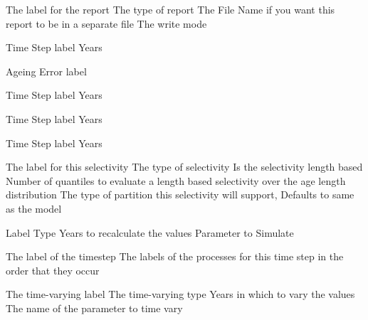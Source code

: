  {The label for the report}
 {The type of report}
 {The File Name if you want this report to be in a separate file}
 {The write mode}
\par\textbf{}\par
{} {Time Step label}
 {Years}
 {}
 {}
\par\textbf{}\par
{} {Ageing Error label}
\par\textbf{}\par
\par\textbf{}\par
{} {Time Step label}
 {Years}
\par\textbf{}\par
{} {Time Step label}
 {Years}
\par\textbf{}\par
{} {Time Step label}
 {Years}
\par\textbf{}\par
{}\par\par
{} {The label for this selectivity}
 {The type of selectivity}
 {Is the selectivity length based}
 {Number of quantiles to evaluate a length based selectivity over the age length distribution}
 {The type of partition this selectivity will support, Defaults to same as the model}
 {}
 {}
\par\par
{} {Label}
 {Type}
 {Years to recalculate the values}
 {Parameter to Simulate}
\par\par
{} {The label of the timestep}
 {The labels of the processes for this time step in the order that they occur}
\par\par
{} {The time-varying label}
 {The time-varying type}
 {Years in which to vary the values}
 {The name of the parameter to time vary}
